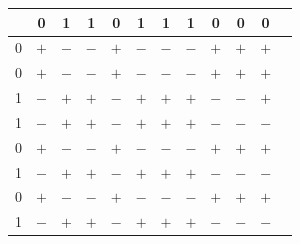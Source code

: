 \begin{table}
\centering
\renewcommand{\arraystretch}{1.5}

\begin{tabular}{|c|c|c|c|c|c|c|c|c|c|c|c|}
\hline
& 0 & 1 & 1 & 0 & 1 & 1 & 1 & 0 & 0 & 0 \\
\hline
0 & \cellcolor{white!30} $+$ & \cellcolor{blue!30} $-$ & \cellcolor{blue!30} $-$ & \cellcolor{white!30} $+$ & \cellcolor{blue!30} $-$ & \cellcolor{blue!30} $-$ & \cellcolor{blue!30} $-$ & \cellcolor{white!30} $+$ & \cellcolor{white!30} $+$ & \cellcolor{white!30} $+$ \\
\hline
0 & \cellcolor{white!30} $+$ & \cellcolor{blue!30} $-$ & \cellcolor{blue!30} $-$ & \cellcolor{white!30} $+$ & \cellcolor{blue!30} $-$ & \cellcolor{blue!30} $-$ & \cellcolor{blue!30} $-$ & \cellcolor{white!30} $+$ & \cellcolor{white!30} $+$ & \cellcolor{white!30} $+$ \\
\hline
1 & \cellcolor{yellow!30} $-$ & \cellcolor{green!30} $+$ & \cellcolor{green!30} $+$ & \cellcolor{yellow!30} $-$ & \cellcolor{green!30} $+$ & \cellcolor{green!30} $+$ & \cellcolor{green!30} $+$ & \cellcolor{yellow!30} $-$ & \cellcolor{yellow!30} $-$ & \cellcolor{yellow!30} $+$ \\
\hline
1 & \cellcolor{yellow!30} $-$ & \cellcolor{green!30} $+$ & \cellcolor{green!30} $+$ & \cellcolor{yellow!30} $-$ & \cellcolor{green!30} $+$ & \cellcolor{green!30} $+$ & \cellcolor{green!30} $+$ & \cellcolor{yellow!30} $-$ & \cellcolor{yellow!30} $-$ & \cellcolor{yellow!30} $-$ \\
\hline
0 & \cellcolor{white!30} $+$ & \cellcolor{blue!30} $-$ & \cellcolor{blue!30} $-$ & \cellcolor{white!30} $+$ & \cellcolor{blue!30} $-$ & \cellcolor{blue!30} $-$ & \cellcolor{blue!30} $-$ & \cellcolor{white!30} $+$ & \cellcolor{white!30} $+$ & \cellcolor{white!30} $+$ \\
\hline
1 & \cellcolor{yellow!30} $-$ & \cellcolor{green!30} $+$ & \cellcolor{green!30} $+$ & \cellcolor{yellow!30} $-$ & \cellcolor{green!30} $+$ & \cellcolor{green!30} $+$ & \cellcolor{green!30} $+$ & \cellcolor{yellow!30} $-$ & \cellcolor{yellow!30} $-$ & \cellcolor{yellow!30} $-$ \\
\hline
0 & \cellcolor{white!30} $+$ & \cellcolor{blue!30} $-$ & \cellcolor{blue!30} $-$ & \cellcolor{white!30} $+$ & \cellcolor{blue!30} $-$ & \cellcolor{blue!30} $-$ & \cellcolor{blue!30} $-$ & \cellcolor{white!30} $+$ & \cellcolor{white!30} $+$ & \cellcolor{white!30} $+$ \\
\hline
1 & \cellcolor{yellow!30} $-$ & \cellcolor{green!30} $+$ & \cellcolor{green!30} $+$ & \cellcolor{yellow!30} $-$ & \cellcolor{green!30} $+$ & \cellcolor{green!30} $+$ & \cellcolor{green!30} $+$ & \cellcolor{yellow!30} $-$ & \cellcolor{yellow!30} $-$ & \cellcolor{yellow!30} $-$ \\

\end{tabular}
\end{table}
